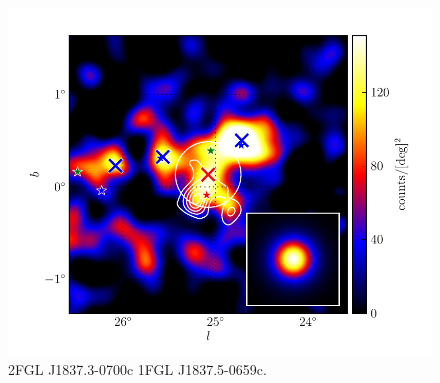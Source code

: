 \documentclass[12pt,preprint]{aastex}
\begin{document}
\begin{figure}
  \begin{center}
    \includegraphics[type=pdf,ext=.pdf,read=.pdf]{source_plots/source_1FGL_J1837.5-0659c}
  \end{center}
  \caption{
2FGL J1837.3-0700c
1FGL J1837.5-0659c. 
  }\label{1FGL_J1837.5-0659c}
\end{figure}
\end{document}
